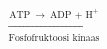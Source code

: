 \documentclass[preview]{standalone}
\begin{document}
\begin{align*}
\xrightarrow[\text{Fosfofruktoosi kinaas}]{\text{ATP}\: \rightarrow\: \text{ADP + H}^{+}}
\end{align*}
\end{document}
